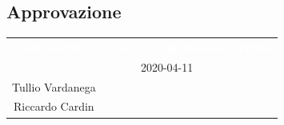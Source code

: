 \subsection{Approvazione} 
\begin{table}[H]
	\begin{center}
	\begin{tabular}{ c c C{8cm} }
		\textcolor{white}{\textbf{Nominativo}} & \textcolor{white}{\textbf{Data di approvazione}} & \textcolor{white}{\textbf{Firma}} \\
		 & 2020-04-11 & \\
		Tullio Vardanega &  & \\
		Riccardo Cardin &  & \\
	\end{tabular}
	\end{center}	
\end{table}

